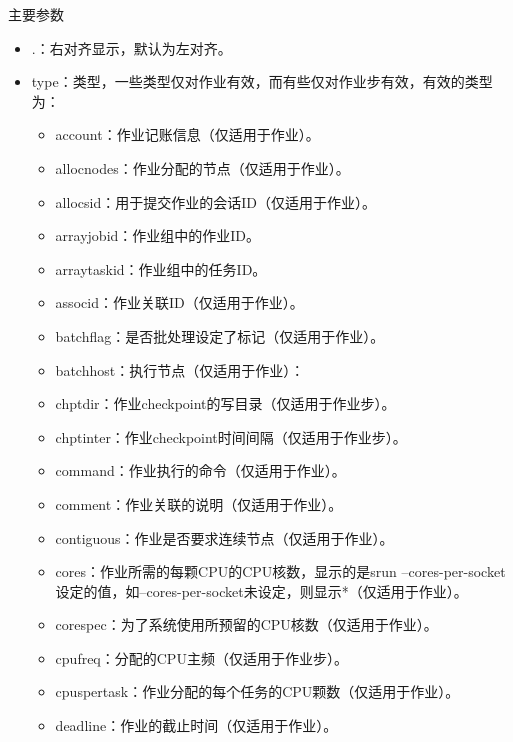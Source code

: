\begin{frame}[fragile]{主要参数}
\begin{itemize}
\begin{itemize}
    \item .：右对齐显示，默认为左对齐。
	\item type：类型，一些类型仅对作业有效，而有些仅对作业步有效，有效的类型为：
\begin{itemize}
	\item account：作业记账信息（仅适用于作业）。
    \item allocnodes：作业分配的节点（仅适用于作业）。
    \item allocsid：用于提交作业的会话ID（仅适用于作业）。
    \item arrayjobid：作业组中的作业ID。
    \item arraytaskid：作业组中的任务ID。
    \item associd：作业关联ID（仅适用于作业）。
    \item batchflag：是否批处理设定了标记（仅适用于作业）。
    \item batchhost：执行节点（仅适用于作业）：
    \item chptdir：作业checkpoint的写目录（仅适用于作业步）。
    \item chptinter：作业checkpoint时间间隔（仅适用于作业步）。
    \item command：作业执行的命令（仅适用于作业）。
    \item comment：作业关联的说明（仅适用于作业）。
    \item contiguous：作业是否要求连续节点（仅适用于作业）。
    \item cores：作业所需的每颗CPU的CPU核数，显示的是srun --cores-per-socket设定的值，如--cores-per-socket未设定，则显示*（仅适用于作业）。
    \item corespec：为了系统使用所预留的CPU核数（仅适用于作业）。
    \item cpufreq：分配的CPU主频（仅适用于作业步）。
    \item cpuspertask：作业分配的每个任务的CPU颗数（仅适用于作业）。
    \item deadline：作业的截止时间（仅适用于作业）。

\end{itemize}
\end{itemize}
\end{itemize}
\end{frame}
